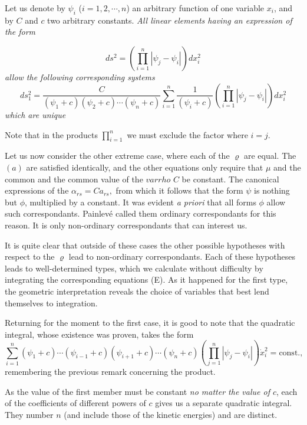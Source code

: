 \documentclass{book}
\begin{document}
Let us denote by $\psi_i$ ($i=1,2,\cdots,n$) an arbitrary function of one variable $x_i$, and by $C$ and $c$ two arbitrary constants. \emph{All linear elements having an expression of the form}

\begin{equation*}
ds^2=\left(\prod_{i=1}^n{\left|\psi_j-\psi_i\right|}\right)dx_i^2
\tag{T}
\end{equation*}
\emph{allow the following corresponding systems}
$$ds_1^2=\frac{C}{(\psi_1+c)(\psi_2+c)\cdots(\psi_n+c)}\sum_{i=1}^n{\frac{1}{(\psi_i+c)}\left(\prod_{i=1}^n{\left|\psi_j-\psi_i\right|}\right)dx_i^2}$$
\emph{which are unique} 

Note that in the products $\displaystyle\prod_{i=1}^n{}$ we must exclude the factor where $i=j$. 

Let us now consider the other extreme case, where each of the $\varrho$ are equal. The $(a)$ are satisfied identically, and the other equations only require that $\mu$ and the common and the common value of the $varrho$ $C$ be constant. The canonical expressions of the $\alpha_{rs}=Ca_{rs},$ from which it follows that the form $\psi$ is nothing but $\phi$, multiplied by a constant. It was evident \emph{a priori} that all forms $\phi$ allow such correspondants. Painlev\'e called them ordinary correspondants for this reason. It is only non-ordinary correspondants that can interest us. 

It is quite clear that outside of these cases the other possible hypotheses with respect to the $\varrho$ lead to non-ordinary correspondants. Each of these hypotheses leads to well-determined types, which we calculate without difficulty by integrating the corresponding equations (E). As it happened for the first type, the geometric interpretation reveals the choice of variables that best lend themselves to integration. 

Returning for the moment to the first case, it is good to note that the quadratic integral, whose existence was proven, takes the form
$$\sum_{i=1}^n{(\psi_1+c)\cdots(\psi_{i-1}+c)(\psi_{i+1}+c)\cdots(\psi_n+c)\left(\prod_{j=1}^n{\left|\psi_j-\psi_i\right|}\right)\dot{x}_i^2}=\text{const.},$$
remembering the previous remark concerning the product.

As the value of the first member must be constant \emph{no matter the value of $c$}, each of the coefficients of different powers of $c$ gives us a separate quadratic integral. They number $n$ (and include those of the kinetic energies) and are distinct. 
\end{document}
